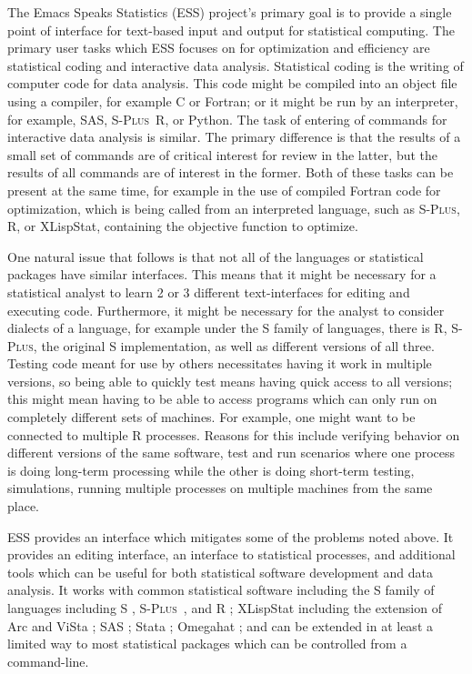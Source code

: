 \documentclass{article}
\newcommand*{\Splus}{\textsc{S-Plus}}
\begin{document}
The Emacs Speaks Statistics (ESS) project's primary goal is to provide
a single point of interface for text-based input and output for
statistical computing.  The primary user tasks which ESS focuses on
for optimization and efficiency are statistical coding and interactive
data analysis.  Statistical coding is the writing of computer code for
data analysis.  This code might be compiled into an object file using
a compiler, for example C or Fortran; or it might be run by an
interpreter, for example, SAS, \Splus\, R, or Python.  The task of
entering of commands for interactive data analysis is similar.  The
primary difference is that the results of a small set of commands are
of critical interest for review in the latter, but the results of all
commands are of interest in the former.  Both of these tasks can be
present at the same time, for example in the use of compiled Fortran
code for optimization, which is being called from an interpreted
language, such as \Splus, R, or XLispStat, containing the objective
function to optimize.

One natural issue that follows is that not all of the languages or
statistical packages have similar interfaces.  This means that it
might be necessary for a statistical analyst to learn 2 or 3 different
text-interfaces for editing and executing code.  Furthermore, it might
be necessary for the analyst to consider dialects of a language, for
example under the S family of languages, there is R, \Splus, the
original S implementation, as well as different versions of all three.
Testing code meant for use by others necessitates having it work in
multiple versions, so being able to quickly test means having quick
access to all versions; this might mean having to be able to access
programs which can only run on completely different sets of machines.
For example, one might want to be connected to multiple R processes.
Reasons for this include verifying behavior on different versions of
the same software, test and run scenarios where one process is doing
long-term processing while the other is doing short-term testing,
simulations, running multiple processes on multiple machines from the
same place.

ESS provides an interface which mitigates some of the problems noted
above.  It provides an editing interface, an interface to statistical
processes, and additional tools which can be useful for both
statistical software development and data analysis.  It works with
common statistical software including the S family of languages
including S \citep{BecRCW88,ChaJH92,ChaJ98}, \Splus\ \citep{Splus},
and R \citep{ihak:gent:1996}; XLispStat \citep{Tier90} including the
extension of Arc \citep{Cook:Weisberg:1999} and ViSta
\citep{youn:fald:mcfa:1992}; SAS \citep{SAS:8.0}; Stata
\citep{Stata:6.0}; Omegahat \citep{DTLang:2000}; and can be extended
in at least a limited way to most statistical packages which can be
controlled from a command-line.
\end{document}
